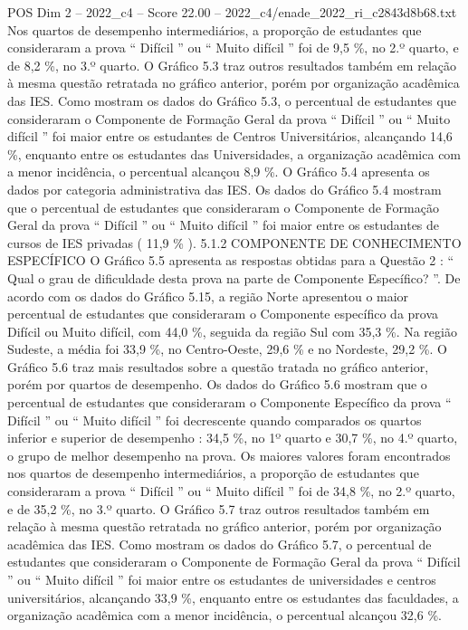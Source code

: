 \begin{textsample}{POS Dim 2 – 2022\_c4 – Score 22.00 – 2022\_c4/enade\_2022\_ri\_c2843d8b68.txt}
Nos quartos de desempenho intermediários, a proporção de estudantes que consideraram a prova “ Difícil ” ou “ Muito difícil ” foi de 9,5 \%, no 2.º quarto, e de 8,2 \%, no 3.º quarto.
O Gráfico 5.3 traz outros resultados também em relação à mesma questão retratada no gráfico anterior, porém por organização acadêmica das IES.
Como mostram os dados do Gráfico 5.3, o percentual de estudantes que consideraram o Componente de Formação Geral da prova “ Difícil ” ou “ Muito difícil ” foi maior entre os estudantes de Centros Universitários, alcançando 14,6 \%, enquanto entre os estudantes das Universidades, a organização acadêmica com a menor incidência, o percentual alcançou 8,9 \%.
O Gráfico 5.4 apresenta os dados por categoria administrativa das IES.
Os dados do Gráfico 5.4 mostram que o percentual de estudantes que consideraram o Componente de Formação Geral da prova “ Difícil ” ou “ Muito difícil ” foi maior entre os estudantes de cursos de IES privadas ( 11,9 \% ). 5.1.2 COMPONENTE DE CONHECIMENTO ESPECÍFICO O Gráfico 5.5 apresenta as respostas obtidas para a Questão 2 : “ Qual o grau de dificuldade desta prova na parte de Componente Específico? ”.
De acordo com os dados do Gráfico 5.15, a região Norte apresentou o maior percentual de estudantes que consideraram o Componente específico da prova Difícil ou Muito difícil, com 44,0 \%, seguida da região Sul com 35,3 \%.
Na região Sudeste, a média foi 33,9 \%, no Centro-Oeste, 29,6 \% e no Nordeste, 29,2 \%.
O Gráfico 5.6 traz mais resultados sobre a questão tratada no gráfico anterior, porém por quartos de desempenho.
Os dados do Gráfico 5.6 mostram que o percentual de estudantes que consideraram o Componente Específico da prova “ Difícil ” ou “ Muito difícil ” foi decrescente quando comparados os quartos inferior e superior de desempenho : 34,5 \%, no 1º quarto e 30,7 \%, no 4.º quarto, o grupo de melhor desempenho na prova.
Os maiores valores foram encontrados nos quartos de desempenho intermediários, a proporção de estudantes que consideraram a prova “ Difícil ” ou “ Muito difícil ” foi de 34,8 \%, no 2.º quarto, e de 35,2 \%, no 3.º quarto.
O Gráfico 5.7 traz outros resultados também em relação à mesma questão retratada no gráfico anterior, porém por organização acadêmica das IES.
Como mostram os dados do Gráfico 5.7, o percentual de estudantes que consideraram o Componente de Formação Geral da prova “ Difícil ” ou “ Muito difícil ” foi maior entre os estudantes de universidades e centros universitários, alcançando 33,9 \%, enquanto entre os estudantes das faculdades, a organização acadêmica com a menor incidência, o percentual alcançou 32,6 \%.

\end{textsample}
